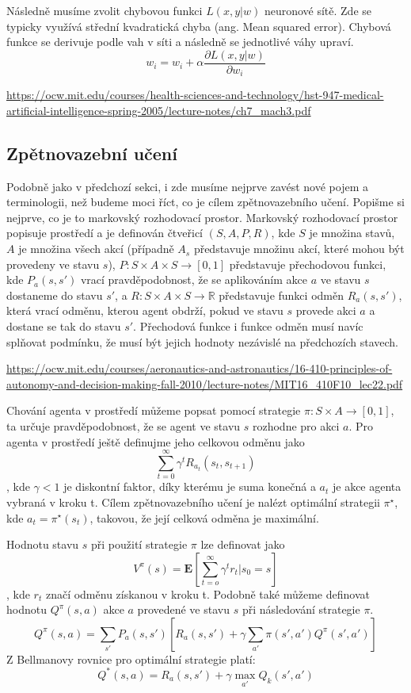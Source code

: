 Následně musíme zvolit chybovou funkci $L(x,y|w)$ neuronové sítě. Zde se typicky využívá střední kvadratická chyba (ang. Mean squared error).
Chybová funkce se derivuje podle vah v síti a následně se jednotlivé váhy upraví.
\newline
\[w_i = w_i + \alpha\frac{\partial L(x,y|w)}{\partial w_i}\]

\url{https://ocw.mit.edu/courses/health-sciences-and-technology/hst-947-medical-artificial-intelligence-spring-2005/lecture-notes/ch7_mach3.pdf}


\subsection{Zpětnovazební učení}
Podobně jako v předchozí sekci, i zde musíme nejprve zavést nové pojem a terminologii, než budeme moci říct, co je cílem zpětnovazebního učení.
Popišme si nejprve, co je to markovský rozhodovací prostor.
Markovský rozhodovací prostor popisuje prostředí a je definován čtveřicí $(S,A,P,R)$, kde $S$ je množina stavů, $A$ je množina všech akcí (případně $A_s$ představuje množinu akcí, které mohou být provedeny ve stavu $s$), 
$P: S \times A \times S \rightarrow [0,1]$ představuje přechodovou funkci, 
kde $P_a(s,s')$ vrací pravděpodobnost, že se aplikováním akce $a$ ve stavu $s$ dostaneme do stavu $s'$, 
a $R: S \times A \times S \rightarrow \mathbb{R}$ představuje funkci odměn $R_a(s,s')$, která vrací odměnu, kterou agent obdrží, pokud ve stavu $s$ provede akci $a$ a dostane se tak do stavu $s'$.
Přechodová funkce i funkce odměn musí navíc splňovat podmínku, že musí být jejich hodnoty nezávislé na předchozích stavech.

\url{https://ocw.mit.edu/courses/aeronautics-and-astronautics/16-410-principles-of-autonomy-and-decision-making-fall-2010/lecture-notes/MIT16_410F10_lec22.pdf}

Chování agenta v prostředí můžeme popsat pomocí strategie $\pi: S \times A \rightarrow [0,1]$, ta určuje pravděpodobnost, že se agent ve stavu $s$ rozhodne pro akci $a$.
Pro agenta v prostředí ještě definujme jeho celkovou odměnu jako \[\sum_{t=0}^{\infty} \gamma^tR_{a_t}(s_t,s_{t+1})\], kde $\gamma<1$ je diskontní faktor, díky kterému je suma konečná a $a_t$ je akce agenta vybraná v kroku t.
Cílem zpětnovazebního učení je nalézt optimální strategii $\pi^\star$, kde $a_t=\pi^\star(s_t)$, takovou, že její celková odměna je maximální.

Hodnotu stavu $s$ při použití strategie $\pi$ lze definovat jako 
\newline
\[V^{\pi}(s)=\mathbf{E}[\sum_{t=o}^{\infty} \gamma^tr_t|s_0=s]\], kde $r_t$ značí odměnu získanou v kroku t.
Podobně také můžeme definovat hodnotu $Q^{\pi}(s,a)$ akce $a$ provedené ve stavu $s$ při následování strategie $\pi$.
\[Q^\pi(s,a)=\sum_{s'}P_a(s,s')[R_a(s,s') + \gamma\sum_{a'} \pi(s',a')Q^\pi(s',a')]\]
Z Bellmanovy rovnice pro optimální strategie platí:
\[Q^*(s,a)=R_a(s,s') + \gamma\max_{a'}Q_k(s',a')\]

